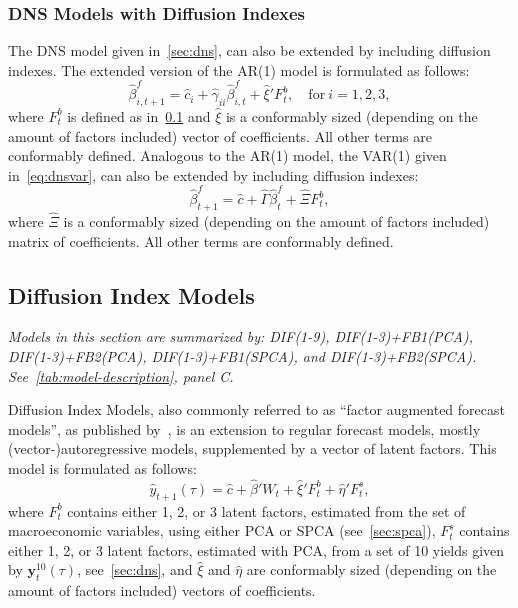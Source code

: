 \subsubsection{DNS Models with Diffusion Indexes}
\label{sec:dnsdif}
The DNS model given in~\cref{sec:dns}, can also be extended by including diffusion indexes. The extended version of the AR(1) model is formulated as follows:
\begin{equation}
	\hat{\beta}_{i,t+1}^{f} = \hat{c}_i + \hat{\gamma}_{ii} \hat{\beta}_{i,t}^f + \hat{\xi}' F_t^b, \quad \text{for}~i = 1,2,3,
\end{equation}
where $F_t^b$ is defined as in~\cref{sec:dif} and $\hat{\xi}$ is a conformably sized (depending on the amount of factors included) vector of coefficients. 
All other terms are conformably defined. 
Analogous to the AR(1) model, the VAR(1) given in~\cref{eq:dnsvar}, can also be extended by including diffusion indexes:
\begin{equation}
	\hat{\beta}_{t+1}^{f} = \hat{c} + \hat{\Gamma} \hat{\beta}_t^f + \hat{\Xi} F_t^b,
\end{equation}
where $\hat{\Xi}$ is a conformably sized (depending on the amount of factors included) matrix of coefficients. 
All other terms are conformably defined.

\subsection{Diffusion Index Models}
\label{sec:dif}
\textit{Models in this section are summarized by: DIF(1-9), DIF(1-3)+FB1(PCA), DIF(1-3)+FB2(PCA), DIF(1-3)+FB1(SPCA), and DIF(1-3)+FB2(SPCA). See~\cref{tab:model-description}, panel C.}

Diffusion Index Models, also commonly referred to as \enquote{factor augmented forecast models}, as published by~\textcite[hereafter DIF]{stock_macroeconomic_2002,stock_forecasting_2002}, is an extension to regular forecast models, mostly (vector-)autoregressive models, supplemented by a vector of latent factors. 
This model is formulated as follows:
\begin{equation}
	\hat{y}_{t+1}(\tau) = \hat{c} + \hat{\beta}' W_t + \hat{\xi}' F_t^b + \hat{\eta}' F_t^s,
\end{equation}
where $F_t^b$ contains either 1, 2, or 3 latent factors, estimated from the set of macroeconomic variables, using either PCA or SPCA (see~\cref{sec:spca}), $F_t^s$ contains either 1, 2, or 3 latent factors, estimated with PCA, from a set of 10 yields given by $\mathbf{y}_t^{10}(\tau)$, see~\cref{sec:dns}, and $\hat{\xi}$ and $\hat{\eta}$ are conformably sized (depending on the amount of factors included) vectors of coefficients. 

